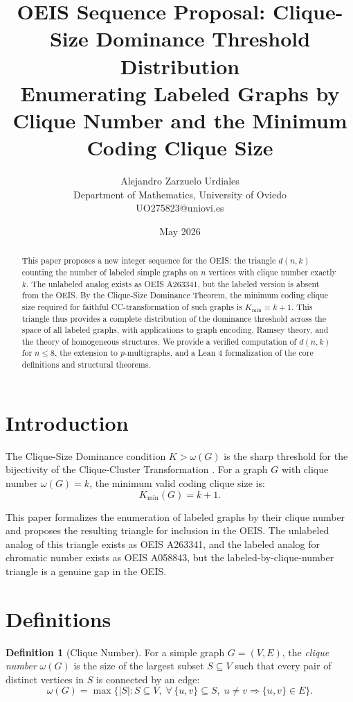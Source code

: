 \documentclass[11pt,a4paper]{article}
\title{OEIS Sequence Proposal: Clique-Size Dominance Threshold Distribution\\
\large Enumerating Labeled Graphs by Clique Number and the Minimum Coding Clique Size}
\author{Alejandro Zarzuelo Urdiales\\
Department of Mathematics, University of Oviedo\\
UO275823@uniovi.es}
\date{May 2026}
\theoremstyle{definition}
\newtheorem{definition}{Definition}[section]
\begin{document}
\maketitle

\begin{abstract}
This paper proposes a new integer sequence for the OEIS: the triangle $d(n, k)$ counting the number of labeled simple graphs on $n$ vertices with clique number exactly $k$. The unlabeled analog exists as OEIS A263341, but the labeled version is absent from the OEIS. By the Clique-Size Dominance Theorem, the minimum coding clique size required for faithful CC-transformation of such graphs is $K_{\min} = k + 1$. This triangle thus provides a complete distribution of the dominance threshold across the space of all labeled graphs, with applications to graph encoding, Ramsey theory, and the theory of homogeneous structures. We provide a verified computation of $d(n, k)$ for $n \leq 8$, the extension to $p$-multigraphs, and a Lean 4 formalization of the core definitions and structural theorems.
\end{abstract}

\section{Introduction}

The Clique-Size Dominance condition $K > \omega(G)$ is the sharp threshold for the bijectivity of the Clique-Cluster Transformation \cite{zarzuelo2025}. For a graph $G$ with clique number $\omega(G) = k$, the minimum valid coding clique size is:
\[
K_{\min}(G) = k + 1.
\]

This paper formalizes the enumeration of labeled graphs by their clique number and proposes the resulting triangle for inclusion in the OEIS. The unlabeled analog of this triangle exists as OEIS A263341, and the labeled analog for chromatic number exists as OEIS A058843, but the labeled-by-clique-number triangle is a genuine gap in the OEIS.

\section{Definitions}

\begin{definition}[Clique Number]
For a simple graph $G = (V, E)$, the \emph{clique number} $\omega(G)$ is the size of the largest subset $S \subseteq V$ such that every pair of distinct vertices in $S$ is connected by an edge:
\[
\omega(G) = \max\{ |S| : S \subseteq V,\; \forall\, \{u,v\} \subseteq S,\; u \neq v \Rightarrow \{u,v\} \in E \}.
\]
\end{definition}
\end{document}
